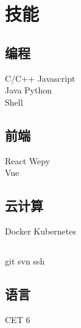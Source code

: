 \documentclass[]{deedy-resume-openfont}
\begin{document}
\begin{minipage}[t]{0.3\textwidth}

\section{技能}
\sectionsep
\subsection{\textbf{编程}}
C/C++ \textbullet{} Javascript\\
 Java \textbullet{} Python \ \\
 Shell  \\ 
\sectionsep

\subsection{\textbf{前端}}
React \textbullet{} Wepy \\
Vue

\subsection{\textbf{云计算}}
Docker \textbullet{} Kubernetes \\

\subsection{}
git \textbullet svn \textbullet ssh \\

\subsection{\textbf{语言}}
CET 6   \\
\sectionsep

%
%

\end{minipage} 
\hfill
\end{document}
